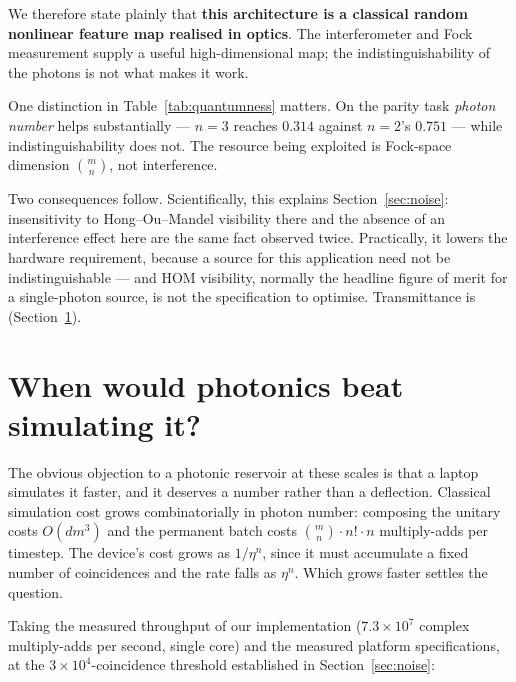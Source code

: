 \documentclass[11pt]{article}
\begin{document}
We therefore state plainly that \textbf{this architecture is a classical random nonlinear
feature map realised in optics}. The interferometer and Fock measurement supply a useful
high-dimensional map; the indistinguishability of the photons is not what makes it work.

One distinction in Table~\ref{tab:quantumness} matters. On the parity task \emph{photon number}
helps substantially --- $n=3$ reaches $0.314$ against $n=2$'s $0.751$ --- while
indistinguishability does not. The resource being exploited is Fock-space dimension
$\binom{m}{n}$, not interference.

Two consequences follow. Scientifically, this explains Section~\ref{sec:noise}: insensitivity
to Hong--Ou--Mandel visibility there and the absence of an interference effect here are the same
fact observed twice. Practically, it lowers the hardware requirement, because a source for this
application need not be indistinguishable --- and HOM visibility, normally the headline figure
of merit for a single-photon source, is not the specification to optimise. Transmittance is
(Section~\ref{sec:crossover}).

\section{When would photonics beat simulating it?}\label{sec:crossover}

The obvious objection to a photonic reservoir at these scales is that a laptop simulates it
faster, and it deserves a number rather than a deflection. Classical simulation cost grows
combinatorially in photon number: composing the unitary costs $O(d m^3)$ and the permanent
batch costs $\binom{m}{n} \cdot n! \cdot n$ multiply-adds per timestep. The device's cost grows
as $1/\eta^{n}$, since it must accumulate a fixed number of coincidences and the rate falls as
$\eta^{n}$. Which grows faster settles the question.

Taking the measured throughput of our implementation ($7.3 \times 10^{7}$ complex multiply-adds
per second, single core) and the measured platform specifications, at the
$3 \times 10^{4}$-coincidence threshold established in Section~\ref{sec:noise}:

\begin{table}[H]\centering
  \PaperTableRates
  \caption{Coincidence rate and the time to collect $3\!\times\!10^{4}$ events per timestep.}
  \label{tab:rates2}
\end{table}
\end{document}
